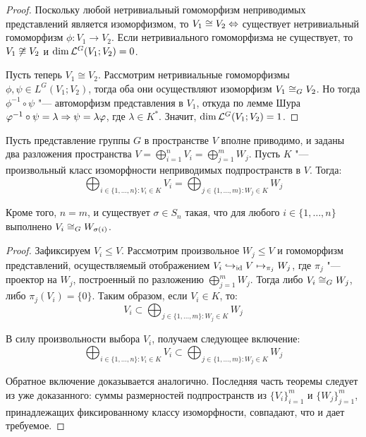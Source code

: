 \begin{proof}
	Поскольку любой нетривиальный гомоморфизм неприводимых представлений является изоморфизмом, то $V_1 \cong V_2 \Leftrightarrow$ существует нетривиальный гомоморфизм $\phi : V_1 \to V_2$. Если нетривиального гомоморфизма не существует, то $V_1\centernot\cong V_2$ и $\dim{\mathcal L^G(V_1; V_2)} = 0$.
	
	Пусть теперь $V_1 \cong V_2$. Рассмотрим нетривиальные гомоморфизмы $\phi, \psi \in L^G(V_1; V_2)$, тогда оба они осуществляют изоморфизм $V_1 \cong_G V_2$. Но тогда $\phi^{-1}\circ\psi$ "--- автоморфизм представления в $V_1$, откуда по лемме Шура $\varphi^{-1}\circ\psi = \lambda \Rightarrow \psi = \lambda \varphi$, где $\lambda \in K^*$. Значит, $\dim{\mathcal L^G(V_1; V_2)} = 1$.
\end{proof}

\begin{theorem}
	Пусть представление группы $G$ в пространстве $V$ вполне приводимо, и заданы два разложения пространства $V = \bigoplus_{i = 1}^nV_i = \bigoplus_{j = 1}^mW_j$. Пусть $K$ "--- произвольный класс изоморфности неприводимых подпространств в $V$. Тогда:
	\[\bigoplus_{i \in \{1, \dotsc, n\} : V_i \in K}V_i = \bigoplus_{j \in \{1, \dotsc, m\}: W_j \in K}W_j\]
	
	Кроме того, $n = m$, и существует $\sigma \in S_n$ такая, что для любого $i \in \{1, \dotsc, n\}$ выполнено $V_i \cong_G W_{\sigma(i)}$.
\end{theorem}

\begin{proof}
	Зафиксируем $V_i \le V$. Рассмотрим произвольное $W_j \le V$ и гомоморфизм представлений, осуществляемый отображением $V_i \hookrightarrow_{\mathrm{id}} V \mapsto_{\pi_j} W_j$, где $\pi_j$ "--- проектор на $W_j$, построенный по разложению $\bigoplus_{j = 1}^mW_j$. Тогда либо $V_i \cong_G W_j$, либо $\pi_j(V_i) = \{0\}$. Таким образом, если $V_i \in K$, то:
	\[V_i \subset \bigoplus_{j \in \{1, \dotsc, m\} : W_j \in K}W_j\]
		
	В силу произвольности выбора $V_i$, получаем следующее включение:
	\[\bigoplus_{i \in \{1, \dotsc, n\} : V_i \in K}V_i \subset \bigoplus_{j \in \{1, \dotsc, m\}: W_j \in K}W_j\]
	
	Обратное включение доказывается аналогично. Последняя часть теоремы следует из уже доказанного: суммы размерностей подпространств из $\{V_i\}_{i = 1}^m$ и $\{W_j\}_{j = 1}^m$, принадлежащих фиксированному классу изоморфности, совпадают, что и дает требуемое.
\end{proof}

